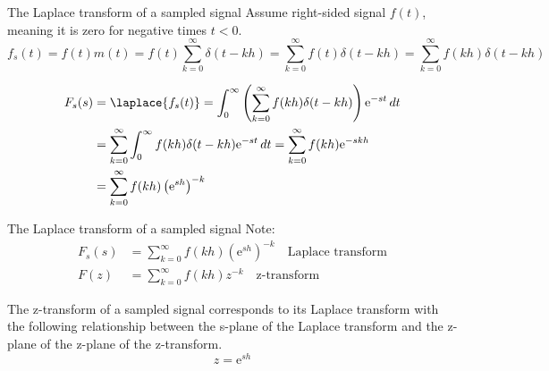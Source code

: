 \documentclass[presentation,aspectratio=169]{beamer}
\begin{document}
\begin{frame}[label={sec:org52e8fce}]{The Laplace transform of a sampled signal}
Assume right-sided signal \(f(t)\), meaning it is zero for negative times \(t<0\).
\[f_s(t) = f(t)m(t) = f(t) \sum_{k=0}^{\infty} \delta(t-kh) = \sum_{k=0}^{\infty} f(t)\delta(t-kh) = \sum_{k=0}^{\infty} f(kh) \delta(t-kh) \]

\pause

\begin{align*}
F_s(s) &= \laplace{f_s(t)} = \int_0^\infty \left(\sum_{k=0}^{\infty} f(kh) \delta(t-kh)\right)\mathrm{e}^{-st}\, dt \\
&= \sum_{k=0}^{\infty} \int_0^\infty  f(kh) \delta(t-kh) \mathrm{e}^{-st}\, dt = \sum_{k=0}^{\infty} f(kh) \mathrm{e}^{-skh}\\
&= \sum_{k=0}^{\infty} f(kh) \left(\mathrm{e}^{sh}\right)^{-k}
\end{align*}
\end{frame}

\begin{frame}[label={sec:orgc661961}]{The Laplace transform of a sampled signal}
Note:
\begin{align*}
F_s(s) &=  \sum_{k=0}^{\infty} f(kh) \left(\mathrm{e}^{sh}\right)^{-k}\quad \text{Laplace transform}\\
F(z) &= \sum_{k=0}^{\infty} f(kh) z^{-k} \quad \text{z-transform}
\end{align*}

\begin{tcolorbox}
 The z-transform of a sampled signal corresponds to its Laplace transform with the following relationship between the s-plane of the Laplace transform and the z-plane of the z-plane of the z-transform.
\[ z = \mathrm{e}^{sh}\]
\end{tcolorbox}
\end{frame}
\end{document}
